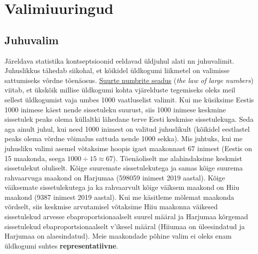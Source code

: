 \documentclass[
]{book}
\begin{document}
\hypertarget{valimiuuringud}{%
\chapter{Valimiuuringud}\label{valimiuuringud}}

\hypertarget{juhuvalim}{%
\section{Juhuvalim}\label{juhuvalim}}

Järeldava statistika kontseptsioonid eeldavad üldjuhul alati nn juhuvalimit. Juhuslikkus tähedab siikohal, et kõikidel üldkogumi liikmetel on valimisse sattumiseks võrdne tõenäosus. \href{'https://en.wikipedia.org/wiki/Law_of_large_numbers}{Suurte numbrite seadus} (\emph{the law of large numbers}) viitab, et ükskõik millise üldkogumi kohta vjärelduste tegemiseks oleks meil sellest üldkogumist vaja umbes 1000 vaatluselist valimit. Kui me küsiksime Eestis 1000 inimese käest nende sissetuleku suurust, siis 1000 inimese keskmine sissetulek peaks olema küllaltki lähedane terve Eesti keskmise sissetulekuga. Seda aga ainult juhul, kui need 1000 inimest on valitud juhuslikult (kõikidel eestlastel peaks olema võrdne võimalus sattuda nende 1000 sekka). Mis juhtuks, kui me juhusliku valimi asemel võtaksime hoopis igast maakonnast 67 inimest (Eestis on 15 maakonda, seega \(1000 \div 15 \approx 67\)). Tõenäoliselt me alahindaksime keskmist sissetulekut oluliselt. Kõige suuremate sissetulekutega ja samas kõige suurema rahvaarvuga maakond on Harjumaa (598059 inimest 2019 aastal). Kõige väiksemate sissetulekutega ja ka rahvaarvult kõige väiksem maakond on Hiiu maakond (9387 inimest 2019 aastal). Kui me käsitleme mõlemat maakonda võrdselt, siis keskmise arvutamisel võtaksime Hiiu maakonna väikesed sissetulekud arvesse ebaproportsionaalselt suurel määral ja Harjumaa kõrgemad sissetulekud ebaproportsionaalselt v'ikesel määral (Hiiumaa on üleesindatud ja Harjumaa on alaesindatud). Meie maakondade põhine valim ei oleks enam üldkogumi suhtes \textbf{representatiivne}.

\providecommand{\docline}[3]{\noalign{\global\setlength{\arrayrulewidth}{#1}}\arrayrulecolor[HTML]{#2}\cline{#3}}

\setlength{\tabcolsep}{2pt}

\renewcommand*{\arraystretch}{1.5}
\end{document}
